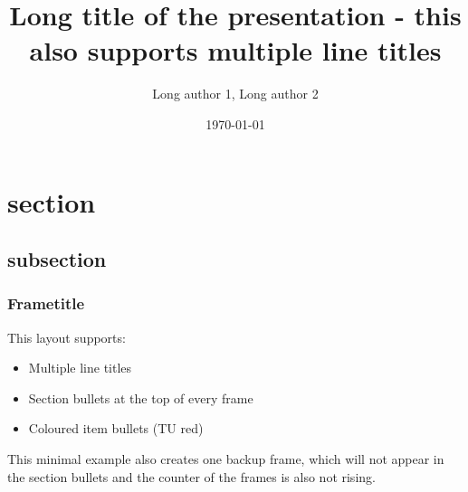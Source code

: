 \documentclass[aspectratio=169]{beamer}
\title[Short title]{Long title of the presentation - this also supports multiple line titles}
\author[Short author]{Long author 1\inst{1}, Long author 2\inst{2}}
\institute{\inst{1}Institute 1 \inst{2}Institute 2}
\date{\today}
\begin{document}
  \frame[plain]{\titlepage}

\section{section}
\subsection{subsection}

\begin{frame}
  \frametitle{Frametitle}
  This layout supports:
  \begin{itemize}
    \item Multiple line titles
    \item Section bullets at the top of every frame
    \item Coloured item bullets (TU red)
    \end{itemize}
  This minimal example also creates one backup frame, which will not appear in the section bullets and the counter of the frames is also not rising.
\end{frame}

\begin{frame}

\end{frame}

\appendix
{}
\setcounter{finalframe}{\value{framenumber}}

\begin{frame}[noframenumbering]

\end{frame}
\end{document}
